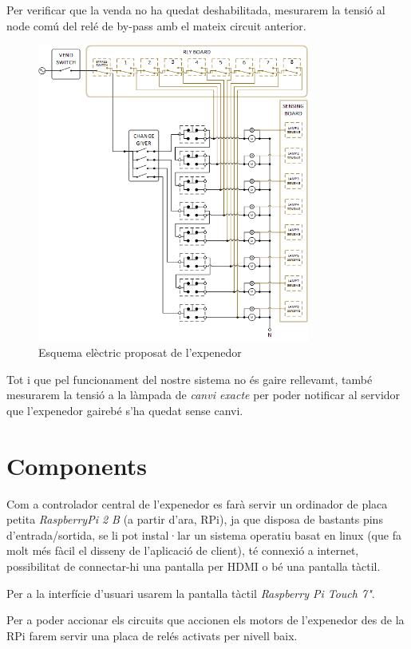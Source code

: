 Per verificar que la venda no ha quedat deshabilitada, mesurarem la tensió al node comú del relé de by-pass amb el mateix circuit anterior.

\begin{figure}[H]
\center
\includegraphics[width=0.8\textwidth]{images/vender_electrical_complete}
\caption{Esquema elèctric proposat de l'expenedor}
\label{fig:vender_electrical_complete}
\end{figure}

Tot i que pel funcionament del nostre sistema no és gaire rellevamt, també mesurarem la tensió a la làmpada de \textit{canvi exacte} per poder notificar al servidor que l'expenedor gairebé s'ha quedat sense canvi.

\section{Components}
Com a controlador central de l'expenedor es farà servir un ordinador de placa petita \textit{RaspberryPi 2 B} (a partir d'ara, RPi), ja que disposa de bastants pins d'entrada/sortida, se li pot instal·lar un sistema operatiu basat en linux (que fa molt més fàcil el disseny de l'aplicació de client), té connexió a internet, possibilitat de connectar-hi una pantalla per HDMI o bé una pantalla tàctil.

Per a la interfície d'usuari usarem la pantalla tàctil \textit{Raspberry Pi Touch 7"}.

Per a poder accionar els circuits que accionen els motors de l'expenedor des de la RPi farem servir una placa de relés activats per nivell baix.

